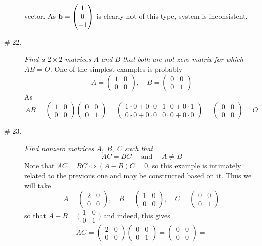 \documentclass[8pt]{article} %
\begin{document}
\begin{description}
{\begin{enumerate}[label=(\alph*)]
			vector. As $\mathbf{b}=\begin{pmatrix}1\\0\\-1\end{pmatrix}$ is clearly not of this type, system is inconsistent.
	\end{enumerate}
	}
\item[\# 22.]{{\it Find a $2\times2$ matrices $A$ and $B$ that both are not zero matrix for which $AB=O$.}
	One of the simplest examples is probably
	\[A=\begin{pmatrix}1&0\\0&0\end{pmatrix},\quad B=\begin{pmatrix}0&0\\0&1\end{pmatrix}\]
	As \[AB=\begin{pmatrix}1&0\\0&0\end{pmatrix}\begin{pmatrix}0&0\\0&1\end{pmatrix}=\begin{pmatrix}
		1\cdot0+0\cdot0&1\cdot0+0\cdot1\\0\cdot0+0\cdot0&0\cdot0+0\cdot0
	\end{pmatrix}=\begin{pmatrix}0&0\\0&0\end{pmatrix}=O\]
	}
\item[\# 23.]{{\it Find nonzero matrices $A,\;B,\;C$ such that}
	\[AC=BC\quad\mbox{ and }\quad A\neq B\]
	Note that $AC=BC\iff (A-B)C=0$, so this example is intimately related to the previous one and may be constructed based on it. Thus we will
	take\[A=\begin{pmatrix}2&0\\0&0\end{pmatrix},\quad B=\begin{pmatrix}1&0\\0&0\end{pmatrix},\quad C=\begin{pmatrix}0&0\\0&1\end{pmatrix}\]
	so that $A-B=\bigl(\begin{smallmatrix}1&0\\0&1\end{smallmatrix}\bigr)$ and indeed, this gives
	\[AC=\begin{pmatrix}2&0\\0&0\end{pmatrix}\begin{pmatrix}0&0\\0&1\end{pmatrix}=\begin{pmatrix}0&0\\0&0\end{pmatrix}=
\]}
\end{description}
\end{document}
